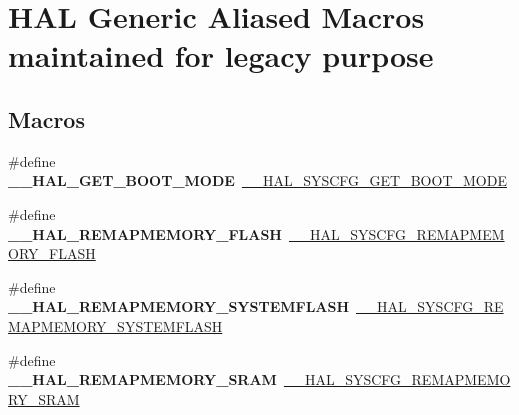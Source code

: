 \hypertarget{group___h_a_l___aliased___macros}{\section{H\-A\-L Generic Aliased Macros maintained for legacy purpose}
\label{group___h_a_l___aliased___macros}
}
\subsection*{Macros}
\begin{DoxyCompactItemize}
\item 
\hypertarget{group___h_a_l___aliased___macros_ga39fe1e2b6eddc3101d95ffb9f1fdfc03}{\#define {\bfseries \-\_\-\-\_\-\-H\-A\-L\-\_\-\-G\-E\-T\-\_\-\-B\-O\-O\-T\-\_\-\-M\-O\-D\-E}~\hyperlink{group___s_y_s_c_f_g___boot_mode_config_ga0e71eb2b553f1a7b8172710184a89caa}{\-\_\-\-\_\-\-H\-A\-L\-\_\-\-S\-Y\-S\-C\-F\-G\-\_\-\-G\-E\-T\-\_\-\-B\-O\-O\-T\-\_\-\-M\-O\-D\-E}}\label{group___h_a_l___aliased___macros_ga39fe1e2b6eddc3101d95ffb9f1fdfc03}

\item 
\hypertarget{group___h_a_l___aliased___macros_ga981a56c85b0612c1085c1d84cf879b35}{\#define {\bfseries \-\_\-\-\_\-\-H\-A\-L\-\_\-\-R\-E\-M\-A\-P\-M\-E\-M\-O\-R\-Y\-\_\-\-F\-L\-A\-S\-H}~\hyperlink{group___s_y_s_c_f_g___boot_mode_config_ga9500619e1ec21659bd32b1dfecd5afc1}{\-\_\-\-\_\-\-H\-A\-L\-\_\-\-S\-Y\-S\-C\-F\-G\-\_\-\-R\-E\-M\-A\-P\-M\-E\-M\-O\-R\-Y\-\_\-\-F\-L\-A\-S\-H}}\label{group___h_a_l___aliased___macros_ga981a56c85b0612c1085c1d84cf879b35}

\item 
\hypertarget{group___h_a_l___aliased___macros_ga476dbd120dafe0fbe3e1e090f85d01ae}{\#define {\bfseries \-\_\-\-\_\-\-H\-A\-L\-\_\-\-R\-E\-M\-A\-P\-M\-E\-M\-O\-R\-Y\-\_\-\-S\-Y\-S\-T\-E\-M\-F\-L\-A\-S\-H}~\hyperlink{group___s_y_s_c_f_g___boot_mode_config_ga59782d94690fd538b25def536c81c3ed}{\-\_\-\-\_\-\-H\-A\-L\-\_\-\-S\-Y\-S\-C\-F\-G\-\_\-\-R\-E\-M\-A\-P\-M\-E\-M\-O\-R\-Y\-\_\-\-S\-Y\-S\-T\-E\-M\-F\-L\-A\-S\-H}}\label{group___h_a_l___aliased___macros_ga476dbd120dafe0fbe3e1e090f85d01ae}

\item 
\hypertarget{group___h_a_l___aliased___macros_ga8ac9efd3dae480b2d5d6487ddf0f1750}{\#define {\bfseries \-\_\-\-\_\-\-H\-A\-L\-\_\-\-R\-E\-M\-A\-P\-M\-E\-M\-O\-R\-Y\-\_\-\-S\-R\-A\-M}~\hyperlink{group___s_y_s_c_f_g___boot_mode_config_ga86d36fdb1571fd56ffeecfaed80c6805}{\-\_\-\-\_\-\-H\-A\-L\-\_\-\-S\-Y\-S\-C\-F\-G\-\_\-\-R\-E\-M\-A\-P\-M\-E\-M\-O\-R\-Y\-\_\-\-S\-R\-A\-M}}\label{group___h_a_l___aliased___macros_ga8ac9efd3dae480b2d5d6487ddf0f1750}


\end{DoxyCompactItemize}
